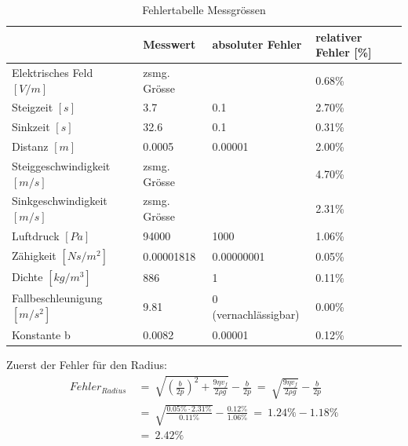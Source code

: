 \begin{table}[h]
	\begin{center}
		\begin{tabular}{l|lll}
			                             & Messwert     & absoluter Fehler     & relativer Fehler [\%] \\ \toprule
			Elektrisches Feld $[V/m]$    & zsmg. Grösse &                      & 0.68\%                \\
			Steigzeit $[s]$              & 3.7          & 0.1                  & 2.70\%                \\
			Sinkzeit $[s]$               & 32.6         & 0.1                  & 0.31\%                \\
			Distanz $[m]$                & 0.0005       & 0.00001              & 2.00\%                \\
			Steiggeschwindigkeit $[m/s]$ & zsmg. Grösse &                      & 4.70\%                \\
			Sinkgeschwindigkeit $[m/s]$  & zsmg. Grösse &                      & 2.31\%                \\
			Luftdruck $[Pa]$             & 94000        & 1000                 & 1.06\%                \\
			Zähigkeit $[Ns/m^2]$         & 0.00001818   & 0.00000001           & 0.05\%                \\
			Dichte $[kg/m^3]$            & 886          & 1                    & 0.11\%                \\
			Fallbeschleunigung $[m/s^2]$ & 9.81         & 0 (vernachlässigbar) & 0.00\%                \\
			Konstante b                  & 0.0082       & 0.00001              & 0.12\%
		\end{tabular}
	\end{center}
	\caption{Fehlertabelle Messgrössen}
	\label{tab:messabsFehler}
\end{table}

\noindent Zuerst der Fehler für den Radius:
\begin{equation*}\label{eq:fehlerRadius}
	\begin{split}
		Fehler_{Radius} & \ = \ \sqrt{\left( \frac{b}{2p}\right)^2 + \frac{9\eta v_f}{2\rho g}} - \frac{b}{2p} \ = \ \sqrt{\frac{9\eta v_f}{2\rho g}} - \frac{b}{2p} \\
		                & \ = \ \sqrt{\frac{0.05\% \cdot 2.31\%}{0.11\%}} - \frac{0.12\%}{1.06\%} \ = \ 1.24\% - 1.18\%                                              \\
		                & \ = \ 2.42\%
	\end{split}
\end{equation*}

